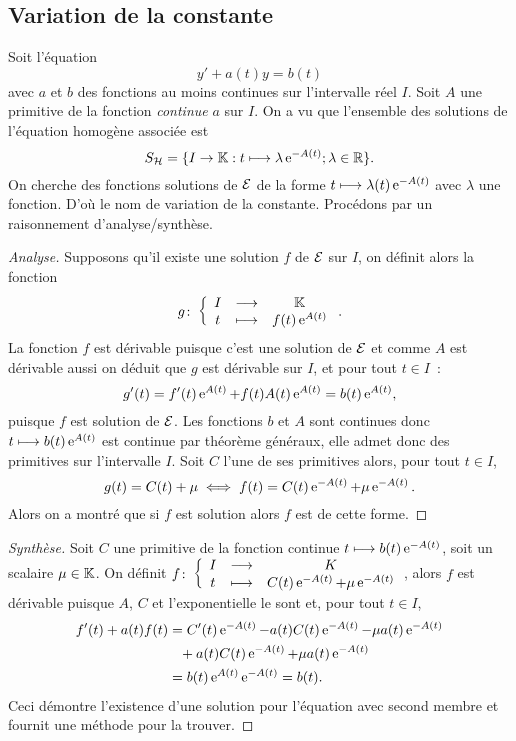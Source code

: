 \subsection{Variation de la constante}
\label{subsec:variationdelaconstante}
Soit l'équation
\begin{equation}
  \label{eq:varcnst}
  y'+a(t)y=b(t)
\end{equation}
avec $a$ et $b$ des fonctions au moins continues sur l'intervalle réel $I$. Soit $A$ une primitive de la fonction \emph{continue} $a$ sur $I$. On a vu que l'ensemble des solutions de l'équation homogène associée est
\begin{equation}
  S_{\mathcal{H}}=\{I \to \mathbb{K} : t \longmapsto \lambda \operatorname{e}^{-A(t)}; \lambda \in \mathbb{R} \}.
\end{equation}
On cherche des fonctions solutions de $\mathcal{E}$ de la forme $t \longmapsto \lambda(t)\operatorname{e}^{-A(t)}$ avec $\lambda$ une fonction. D'où le nom de variation de la constante. Procédons par un raisonnement d'analyse/synthèse.
\begin{proof}[Analyse] Supposons qu'il existe une solution $f$ de $\mathcal{E}$ sur $I$, on définit alors la fonction
  \begin{equation}
    g\colon \left\{\begin{array}{ccc} I & \longrightarrow &\mathbb{K}\\ t & \longmapsto & f(t)\operatorname{e}^{A(t)} \end{array} \right..
  \end{equation}
  La fonction $f$ est dérivable puisque c'est une solution de $\mathcal{E}$ et comme $A$ est dérivable aussi on déduit que $g$ est dérivable sur $I$, et pour tout $t \in I$~:
\begin{equation}
  g'(t)=f'(t)\operatorname{e}^{A(t)}+f(t)A(t)\operatorname{e}^{A(t)}=b(t)\operatorname{e}^{A(t)},
\end{equation}
puisque $f$ est solution de $\mathcal{E}$. Les fonctions $b$ et $A$ sont continues donc $t \longmapsto b(t)\operatorname{e}^{A(t)}$ est continue par théorème généraux, elle admet donc des primitives sur l'intervalle $I$. Soit $C$ l'une de ses primitives alors, pour tout $t \in I$, 
\begin{equation}
  g(t) = C(t) + \mu \iff f(t)=C(t)\operatorname{e}^{-A(t)} + \mu \operatorname{e}^{-A(t)}.
\end{equation}
Alors on a montré que si $f$ est solution alors $f$ est de cette forme.
\end{proof}
\begin{proof}[Synthèse] Soit $C$ une primitive de la fonction continue $t \longmapsto b(t)\operatorname{e}^{-A(t)}$, soit un scalaire $\mu \in \mathbb{K}$. On définit $f\colon \left\{\begin{array}{ccc} I & \longrightarrow &K\\ t & \longmapsto & C(t)\operatorname{e}^{-A(t)}+\mu \operatorname{e}^{-A(t)} \end{array} \right.$, alors $f$ est dérivable puisque $A$, $C$ et l'exponentielle le sont et, pour tout $t \in I$,
  \begin{align}
    f'(t)+a(t)f(t)&=C'(t) \operatorname{e}^{-A(t)} -a(t)C(t)\operatorname{e}^{-A(t)}-\mu a(t) \operatorname{e}^{-A(t)} \notag \\ 
    &\phantom{=}+ a(t)C(t)\operatorname{e}^{-A(t)} + \mu a(t) \operatorname{e}^{-A(t)} \\ 
    & = b(t) \operatorname{e}^{A(t)} \operatorname{e}^{-A(t)}=b(t).
  \end{align}
Ceci démontre l'existence d'une solution pour l'équation avec second membre et fournit une méthode pour la trouver.
\end{proof}
